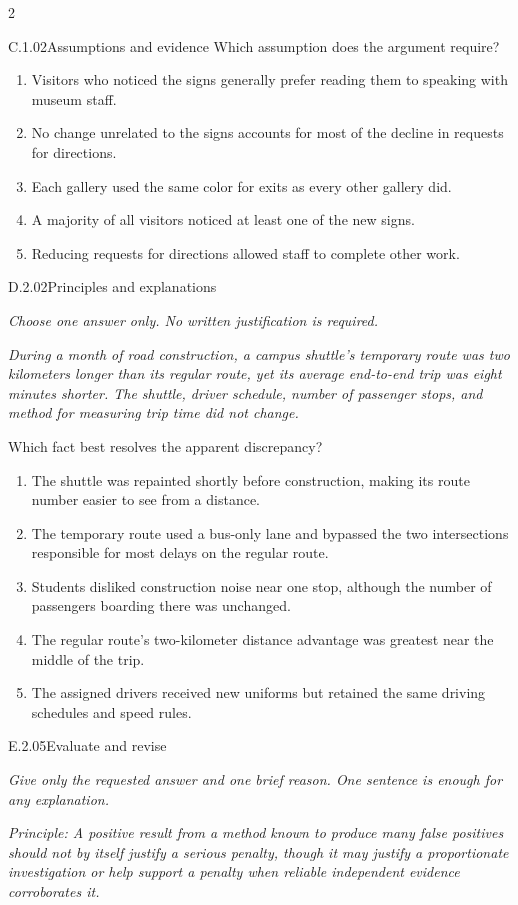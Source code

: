 \documentclass[9pt]{extarticle}
\newcommand{\choice}[1]{\item #1}
\begin{document}
\begin{multicols}{2}
\begin{DenseCoreProblem}{C.1.02}{Assumptions and evidence}
Which assumption does the argument require?
\begin{enumerate}[label=(\alph*)]
  \choice{Visitors who noticed the signs generally prefer reading them to speaking with museum staff.}
  \choice{No change unrelated to the signs accounts for most of the decline in requests for directions.}
  \choice{Each gallery used the same color for exits as every other gallery did.}
  \choice{A majority of all visitors noticed at least one of the new signs.}
  \choice{Reducing requests for directions allowed staff to complete other work.}
\end{enumerate}
\end{DenseCoreProblem}
\begin{DenseCoreProblem}{D.2.02}{Principles and explanations}
{\scriptsize\textit{Choose one answer only. No written justification is required.}\par}
\emph{During a month of road construction, a campus shuttle's temporary route was two kilometers longer than its regular route, yet its average end-to-end trip was eight minutes shorter. The shuttle, driver schedule, number of passenger stops, and method for measuring trip time did not change.}

Which fact best resolves the apparent discrepancy?
\begin{enumerate}[label=(\alph*)]
  \choice{The shuttle was repainted shortly before construction, making its route number easier to see from a distance.}
  \choice{The temporary route used a bus-only lane and bypassed the two intersections responsible for most delays on the regular route.}
  \choice{Students disliked construction noise near one stop, although the number of passengers boarding there was unchanged.}
  \choice{The regular route's two-kilometer distance advantage was greatest near the middle of the trip.}
  \choice{The assigned drivers received new uniforms but retained the same driving schedules and speed rules.}
\end{enumerate}
\end{DenseCoreProblem}
\begin{DenseCoreProblem}{E.2.05}{Evaluate and revise}
{\scriptsize\textit{Give only the requested answer and one brief reason. One sentence is enough for any explanation.}\par}
\emph{Principle: A positive result from a method known to produce many false positives should not by itself justify a serious penalty, though it may justify a proportionate investigation or help support a penalty when reliable independent evidence corroborates it.}


\end{DenseCoreProblem}
\end{multicols}
\end{document}
